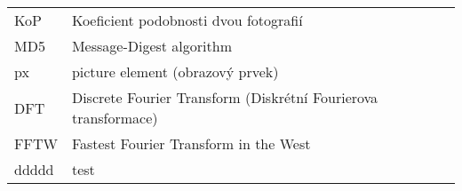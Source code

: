 
\seznamzkr

\begin{tabular}{ll}
  KoP	& Koeficient podobnosti dvou fotografií								\\
  MD5	& Message-Digest algorithm											\\
  px	& picture element (obrazový prvek)									\\
  DFT	& Discrete Fourier Transform (Diskrétní Fourierova transformace)	\\
  FFTW	& Fastest Fourier Transform in the West \\
  ddddd	& test
\end{tabular}

